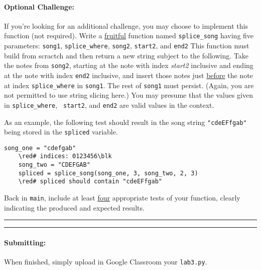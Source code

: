 \documentclass[10pt]{article}
\newcommand{\blk}{\color{black}}
\newcommand{\red}{\color{red}}
\begin{document}
  \paragraph{Optional Challenge:} If you're looking for an additional challenge,
    you may choose to implement this function (not required).
    Write a \uline{fruitful} function named {\tt splice\_song} having 
        five parameters: {\tt song1}, {\tt splice\_where}, {\tt song2},
        {\tt start2}, and {\tt end2}
        This function must build from scractch and then return a new string
        subject to the following.
        Take the notes from {\tt song2}, starting at the note with index {\it
        start2} inclusive and ending at the note with index {\tt end2}
        inclusive, and insert those notes just \uline{before} the note at index
        {\tt splice\_where} in {\tt song1}.
        The rest of {\tt song1} must persist.
        (Again, you are not permitted to use string slicing here.)
        You may presume that the values given in {\tt splice\_where}, {\tt
        start2}, and {\tt end2} are valid values in the context.

        As an example, the following test should result in the song string
        \verb+"cdeEFfgab"+ being stored in the {\tt spliced} variable.
\begin{Verbatim}[commandchars=\\\{\}]
    song_one = "cdefgab"
    \red# indices: 0123456\blk
    song_two = "CDEFGAB"
    spliced = splice_song(song_one, 3, song_two, 2, 3)
    \red# spliced should contain "cdeEFfgab"
\end{Verbatim}

        Back in {\tt main}, include at least \uline{four} appropriate tests of your
        function, clearly indicating the produced and expected results.

  \vspace*{10pt} \hrule \vspace*{1pt} \hrule

  \vspace*{-15pt}
  \paragraph{Submitting:}
    When finished, simply upload in Google Classroom your {\tt lab3.py}.
\end{document}
